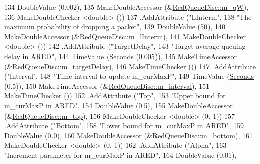 \begin{DoxyCode}
134                    DoubleValue (0.002),
135                    MakeDoubleAccessor (&\hyperlink{classns3_1_1RedQueueDisc_aed406d18723a07fe991497553abed6da}{RedQueueDisc::m\_qW}),
136                    MakeDoubleChecker <double> ())
137     .AddAttribute (\textcolor{stringliteral}{"LInterm"},
138                    \textcolor{stringliteral}{"The maximum probability of dropping a packet"},
139                    DoubleValue (50),
140                    MakeDoubleAccessor (&\hyperlink{classns3_1_1RedQueueDisc_a7ac61b7250a5d9af2fcba2a55e0d3256}{RedQueueDisc::m\_lInterm}),
141                    MakeDoubleChecker <double> ())
142     .AddAttribute (\textcolor{stringliteral}{"TargetDelay"},
143                    \textcolor{stringliteral}{"Target average queuing delay in ARED"},
144                    TimeValue (\hyperlink{group__timecivil_ga33c34b816f8ff6628e33d5c8e9713b9e}{Seconds} (0.005)),
145                    MakeTimeAccessor (&\hyperlink{classns3_1_1RedQueueDisc_aa0467c2e9ccdeb445fcd5e876669a3f2}{RedQueueDisc::m\_targetDelay}),
146                    \hyperlink{group__time_ga7032965bd4afa578691d88c09e4481c1}{MakeTimeChecker} ())
147     .AddAttribute (\textcolor{stringliteral}{"Interval"},
148                    \textcolor{stringliteral}{"Time interval to update m\_curMaxP"},
149                    TimeValue (\hyperlink{group__timecivil_ga33c34b816f8ff6628e33d5c8e9713b9e}{Seconds} (0.5)),
150                    MakeTimeAccessor (&\hyperlink{classns3_1_1RedQueueDisc_a2b9b3cdf14386d08677f62199489d688}{RedQueueDisc::m\_interval}),
151                    \hyperlink{group__time_ga7032965bd4afa578691d88c09e4481c1}{MakeTimeChecker} ())
152     .AddAttribute (\textcolor{stringliteral}{"Top"},
153                    \textcolor{stringliteral}{"Upper bound for m\_curMaxP in ARED"},
154                    DoubleValue (0.5),
155                    MakeDoubleAccessor (&\hyperlink{classns3_1_1RedQueueDisc_a6df2255795fef0607a0e5ea99d9bf3f3}{RedQueueDisc::m\_top}),
156                    MakeDoubleChecker <double> (0, 1))
157     .AddAttribute (\textcolor{stringliteral}{"Bottom"},
158                    \textcolor{stringliteral}{"Lower bound for m\_curMaxP in ARED"},
159                    DoubleValue (0.0),
160                    MakeDoubleAccessor (&\hyperlink{classns3_1_1RedQueueDisc_a9a3204c76843c255e25de29ecca1a0b1}{RedQueueDisc::m\_bottom}),
161                    MakeDoubleChecker <double> (0, 1))
162     .AddAttribute (\textcolor{stringliteral}{"Alpha"},
163                    \textcolor{stringliteral}{"Increment parameter for m\_curMaxP in ARED"},
164                    DoubleValue (0.01),

\end{DoxyCode}

